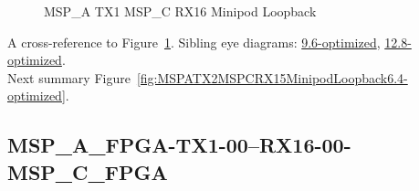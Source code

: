 \begin{figure}[h]
\begin{subfigure}{0.33\textwidth}
\hyperref[sec:MSPAFPGATX106RX1606MSPCFPGA6.4-optimized]{}
\end{subfigure}\hspace*{\fill}
\begin{subfigure}{0.33\textwidth}
\hyperref[sec:MSPAFPGATX107RX1607MSPCFPGA6.4-optimized]{}
\end{subfigure}\hspace*{\fill}
\begin{subfigure}{0.33\textwidth}
\hyperref[sec:MSPAFPGATX108RX1608MSPCFPGA6.4-optimized]{}
\end{subfigure}

\begin{subfigure}{0.33\textwidth}
\hyperref[sec:MSPAFPGATX109RX1609MSPCFPGA6.4-optimized]{}
\end{subfigure}\hspace*{\fill}
\begin{subfigure}{0.33\textwidth}
\hyperref[sec:MSPAFPGATX110RX1610MSPCFPGA6.4-optimized]{}
\end{subfigure}\hspace*{\fill}
\begin{subfigure}{0.33\textwidth}
\hyperref[sec:MSPAFPGATX111RX1611MSPCFPGA6.4-optimized]{}
\end{subfigure}

\caption{MSP\_A TX1 MSP\_C RX16 Minipod Loopback} \label{fig:MSPATX1MSPCRX16MinipodLoopback6.4-optimized}
\end{figure}

A cross-reference to Figure~\ref{fig:MSPATX1MSPCRX16MinipodLoopback6.4-optimized}.
Sibling eye diagrams: \hyperref[sec:MSPATX1MSPCRX16MinipodLoopback9.6-optimized]{9.6-optimized}, \hyperref[sec:MSPATX1MSPCRX16MinipodLoopback12.8-optimized]{12.8-optimized}. \\
Next summary Figure~\ref{fig:MSPATX2MSPCRX15MinipodLoopback6.4-optimized}.
\clearpage
% 
\subsection{MSP\_A\_FPGA-TX1-00--RX16-00-MSP\_C\_FPGA}\label{sec:MSPAFPGATX100RX1600MSPCFPGA6.4-optimized}

